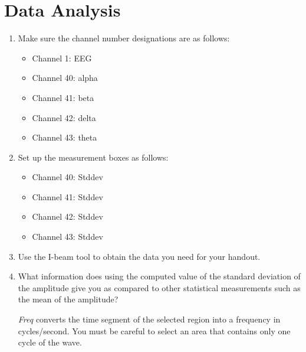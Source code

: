 \documentclass{article}
\begin{document}
\section*{Data Analysis}
\begin{enumerate}
	\item Make sure the channel number designations are as follows:
		\begin{itemize}
			\item Channel 1: EEG
			\item Channel 40: alpha
			\item Channel 41: beta
			\item Channel 42: delta
			\item Channel 43: theta
		\end{itemize}
		
	\item Set up the measurement boxes as follows:\begin{itemize}
		\item Channel 40: Stddev
		\item Channel 41: Stddev
		\item Channel 42: Stddev
		\item Channel 43: Stddev
	\end{itemize}
	
	\item Use the I-beam tool to obtain the data you need for your handout.
	\item What information does using the computed value of the standard deviation of the amplitude give you as compared to other statistical measurements such as the mean of the amplitude?
	\begin{info}
		\textit{Freq} converts the time segment of the selected region into a frequency in cycles/second. You must be careful to select an area that contains only one cycle of the wave.
	\end{info}
	

\end{enumerate}
\end{document}
